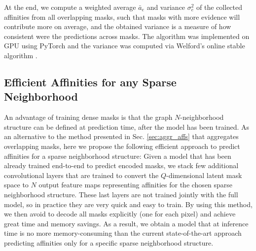 At the end, we compute a weighted average $\bar{a}_e$ and variance $\sigma^2_e$ of the collected affinities from all overlapping masks, such that masks with more evidence will contribute more on average, and the obtained variance is a measure of how consistent were the predictions across masks. 
The algorithm was implemented on GPU using PyTorch \cite{NEURIPS2019_9015} and the variance was computed via Welford's online stable algorithm \cite{welford1962note}.


\subsection{Efficient Affinities for any Sparse Neighborhood}\label{sec:efficient_affs}
An advantage of training dense \maskname masks is that the graph $N$-neighborhood structure can be defined at prediction time, after the model has been trained. As an alternative to the method presented in Sec. \ref{sec:aggr_affs} that aggregates overlapping masks, here we propose the following efficient approach to predict affinities for a sparse neighborhood structure: Given a model that has been already trained end-to-end to predict encoded \maskname masks, we stack few additional convolutional layers that are trained to convert the $Q$-dimensional latent mask space to $N$ output feature maps representing affinities for the chosen sparse neighborhood structure. These last layers are not trained jointly with the full model, so in practice they are very quick and easy to train. By using this method, we then avoid to decode all masks explicitly (one for each pixel) and achieve great time and memory savings.
As a result, we obtain a model that at inference time is no more memory-consuming than the current state-of-the-art approach predicting affinities only for a specific sparse neighborhood structure.



